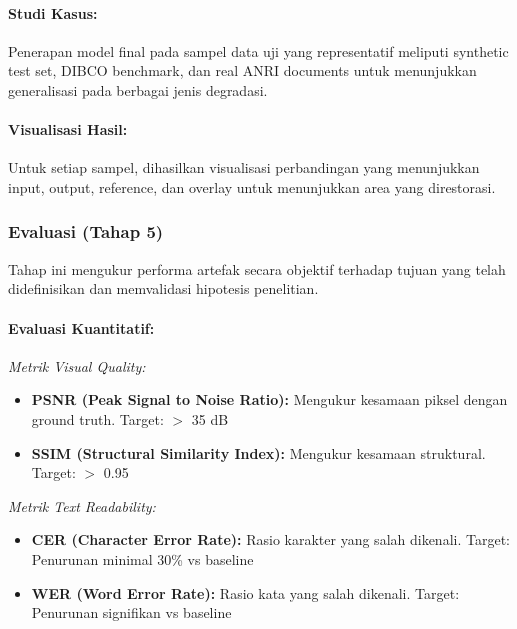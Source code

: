\documentclass[12pt,a4paper]{article}
\begin{document}
\paragraph{Studi Kasus:}
Penerapan model final pada sampel data uji yang representatif meliputi synthetic test set, DIBCO benchmark, dan real ANRI documents untuk menunjukkan generalisasi pada berbagai jenis degradasi.

\paragraph{Visualisasi Hasil:}
Untuk setiap sampel, dihasilkan visualisasi perbandingan yang menunjukkan input, output, reference, dan overlay untuk menunjukkan area yang direstorasi.

\subsubsection{Evaluasi (Tahap 5)}
Tahap ini mengukur performa artefak secara objektif terhadap tujuan yang telah didefinisikan dan memvalidasi hipotesis penelitian.

\paragraph{Evaluasi Kuantitatif:}

\textit{Metrik Visual Quality:}
\begin{itemize}[leftmargin=*, nosep]
\item \textbf{PSNR (Peak Signal to Noise Ratio):} Mengukur kesamaan piksel dengan ground truth. Target: $>$ 35 dB
\item \textbf{SSIM (Structural Similarity Index):} Mengukur kesamaan struktural. Target: $>$ 0.95
\end{itemize}

\textit{Metrik Text Readability:}
\begin{itemize}[leftmargin=*, nosep]
\item \textbf{CER (Character Error Rate):} Rasio karakter yang salah dikenali. Target: Penurunan minimal 30\% vs baseline
\item \textbf{WER (Word Error Rate):} Rasio kata yang salah dikenali. Target: Penurunan signifikan vs baseline
\end{itemize}
\end{document}
